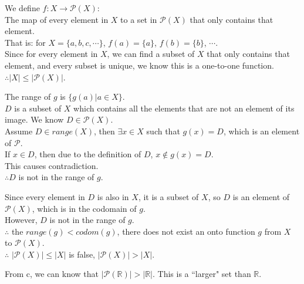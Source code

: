 \documentclass[12pt]{exam}
\begin{document}
\begin{solution}
    \begin{qparts}
        \item
        We define $f: X \rightarrow \mathcal{P}(X)$: \\
        The map of every element in $X$ to a set in $\mathcal{P}(X)$ that 
        only contains that element.\\
        That is: for $X = \{a,b,c,\cdots\}$, $f(a) = \{a\}$, $f(b) = \{b\}$, $\cdots$.\\
        Since for every element in $X$, we can find a subset of $X$ that only contains that element, 
        and every subset is unique, we know this is a one-to-one function.\\
        $\therefore |X| \leq |\mathcal{P}(X)|$.
        \item
        The range of $g$ is $\{ g(a) | a \in X\}$. \\
        $D$ is a subset of $X$ which contains all the elements that are not an element of its image. We know $D \in \mathcal{P}(X).$\\
        Assume $D \in range(X)$, then $\exists x \in X$ such that $g(x) = D$, which is an element of $\mathcal{P}$.\\
        If $x \in D$, then due to the definition of $D$, $x \not \in g(x) = D$.\\
         This causes contradiction.\\
        $\therefore D$ is not in the range of $g$.
        \item
        Since every element in $D$ is also in $X$, it is a subset of $X$, so $D$ is an element of $\mathcal{P}(X)$, which is 
        in the codomain of $g$.\\
        However, $D$ is not in the range of $g$.\\
        $\therefore$ the $range(g) < codom(g)$, there does not exist an onto function $g$ from $X$ to $\mathcal{P}(X)$.\\
        $\therefore$ $|\mathcal{P}(X)| \leq |X|$ is false, $|\mathcal{P}(X)| > |X|$.
        \item
        From c, we can know that $| \mathcal{P}(\mathbb{R}) | > |\mathbb{R}|$. This is a ``larger" set than $\mathbb{R}$.

    \end{qparts}
\end{solution}
\end{document}
